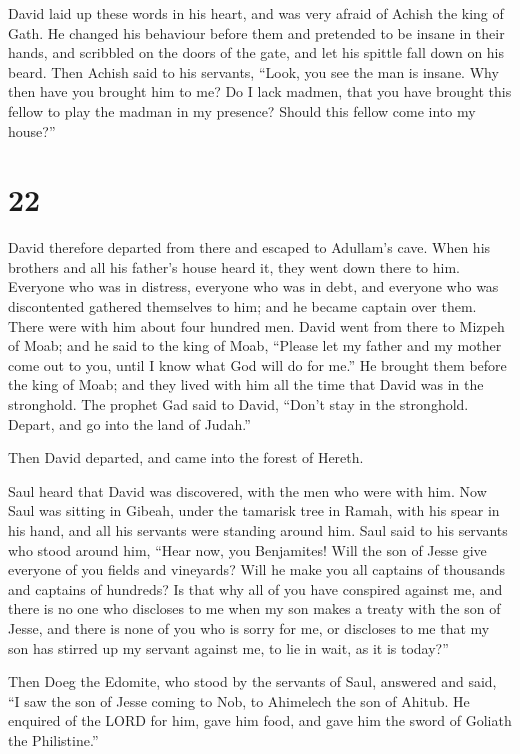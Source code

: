  David laid up these words in his heart, and was very
afraid of Achish the king of Gath.  He changed his
behaviour before them and pretended to be insane in their hands, and
scribbled on the doors of the gate, and let his spittle fall down on his
beard.  Then Achish said to his servants, ``Look, you see
the man is insane. Why then have you brought him to me?  Do
I lack madmen, that you have brought this fellow to play the madman in
my presence? Should this fellow come into my house?''

\hypertarget{section-21}{%
\section{22}\label{section-21}}

 David therefore departed from there and escaped to
Adullam's cave. When his brothers and all his father's house heard it,
they went down there to him.  Everyone who was in distress,
everyone who was in debt, and everyone who was discontented gathered
themselves to him; and he became captain over them. There were with him
about four hundred men.  David went from there to Mizpeh of
Moab; and he said to the king of Moab, ``Please let my father and my
mother come out to you, until I know what God will do for me.''
 He brought them before the king of Moab; and they lived
with him all the time that David was in the stronghold.  The
prophet Gad said to David, ``Don't stay in the stronghold. Depart, and
go into the land of Judah.''

Then David departed, and came into the forest of Hereth.

 Saul heard that David was discovered, with the men who were
with him. Now Saul was sitting in Gibeah, under the tamarisk tree in
Ramah, with his spear in his hand, and all his servants were standing
around him.  Saul said to his servants who stood around him,
``Hear now, you Benjamites! Will the son of Jesse give everyone of you
fields and vineyards? Will he make you all captains of thousands and
captains of hundreds?  Is that why all of you have conspired
against me, and there is no one who discloses to me when my son makes a
treaty with the son of Jesse, and there is none of you who is sorry for
me, or discloses to me that my son has stirred up my servant against me,
to lie in wait, as it is today?''

 Then Doeg the Edomite, who stood by the servants of Saul,
answered and said, ``I saw the son of Jesse coming to Nob, to Ahimelech
the son of Ahitub.  He enquired of the LORD for him, gave
him food, and gave him the sword of Goliath the Philistine.''

